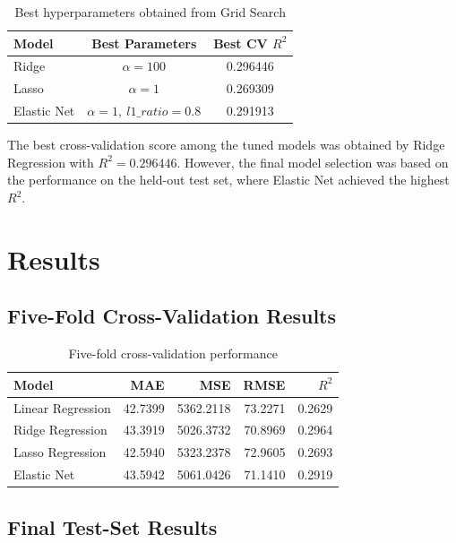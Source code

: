 \documentclass[12pt,a4paper]{article}
\begin{document}
\begin{table}[H]
\centering
\caption{Best hyperparameters obtained from Grid Search}
\begin{tabular}{lcc}
\toprule
\textbf{Model} & \textbf{Best Parameters} & \textbf{Best CV $R^2$} \\
\midrule
Ridge & $\alpha=100$ & 0.296446 \\
Lasso & $\alpha=1$ & 0.269309 \\
Elastic Net & $\alpha=1,\ l1\_ratio=0.8$ & 0.291913 \\
\bottomrule
\end{tabular}
\end{table}

The best cross-validation score among the tuned models was obtained by Ridge Regression with $R^2=0.296446$. However, the final model selection was based on the performance on the held-out test set, where Elastic Net achieved the highest $R^2$.

\section{Results}

\subsection{Five-Fold Cross-Validation Results}

\begin{table}[H]
\centering
\caption{Five-fold cross-validation performance}
\begin{tabular}{lrrrr}
\toprule
\textbf{Model} & \textbf{MAE} & \textbf{MSE} & \textbf{RMSE} & \textbf{$R^2$} \\
\midrule
Linear Regression & 42.7399 & 5362.2118 & 73.2271 & 0.2629 \\
Ridge Regression & 43.3919 & 5026.3732 & 70.8969 & 0.2964 \\
Lasso Regression & 42.5940 & 5323.2378 & 72.9605 & 0.2693 \\
Elastic Net & 43.5942 & 5061.0426 & 71.1410 & 0.2919 \\
\bottomrule
\end{tabular}
\end{table}

\subsection{Final Test-Set Results}
\end{document}
